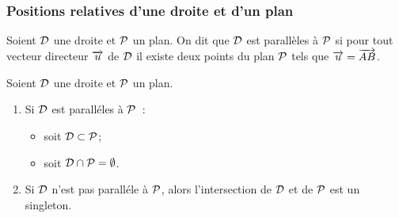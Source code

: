 \subsubsection{Positions relatives d'une droite et d'un plan}

\begin{defdef}
  Soient \(\Dr\) une droite et \(\P\) un plan. On dit que \(\Dr\) est parallèles à \(\P\) si pour tout vecteur directeur \(\vu\) de \(\Dr\) il existe deux points du plan \(\P\) tels que \(\vu=\vect{AB}\).
\end{defdef}
\begin{prop}
  Soient \(\Dr\) une droite et \(\P\) un plan.
  \begin{enumerate}
  \item Si \(\Dr\) est paralléles à \(\P\)~:
    \begin{itemize}
    \item soit \(\Dr\subset\P\);
    \item soit \(\Dr\cap\P=\emptyset\).
    \end{itemize}
  \item Si \(\Dr\) n'est pas paralléle à \(\P\), alors l'intersection de \(\Dr\) et de \(\P\) est un singleton.
  \end{enumerate}
\end{prop}
